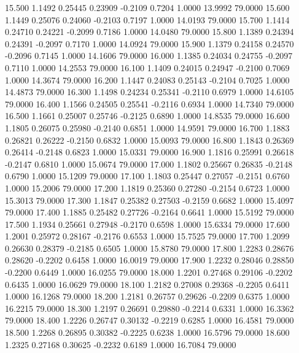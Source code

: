  15.500   1.1492   0.25445   0.23909  -0.2109   0.7204   1.0000  13.9992  79.0000
  15.600   1.1449   0.25076   0.24060  -0.2103   0.7197   1.0000  14.0193  79.0000
  15.700   1.1414   0.24710   0.24221  -0.2099   0.7186   1.0000  14.0480  79.0000
  15.800   1.1389   0.24394   0.24391  -0.2097   0.7170   1.0000  14.0924  79.0000
  15.900   1.1379   0.24158   0.24570  -0.2096   0.7145   1.0000  14.1606  79.0000
  16.000   1.1385   0.24034   0.24755  -0.2097   0.7110   1.0000  14.2553  79.0000
  16.100   1.1409   0.24015   0.24947  -0.2100   0.7069   1.0000  14.3674  79.0000
  16.200   1.1447   0.24083   0.25143  -0.2104   0.7025   1.0000  14.4873  79.0000
  16.300   1.1498   0.24234   0.25341  -0.2110   0.6979   1.0000  14.6105  79.0000
  16.400   1.1566   0.24505   0.25541  -0.2116   0.6934   1.0000  14.7340  79.0000
  16.500   1.1661   0.25007   0.25746  -0.2125   0.6890   1.0000  14.8535  79.0000
  16.600   1.1805   0.26075   0.25980  -0.2140   0.6851   1.0000  14.9591  79.0000
  16.700   1.1883   0.26821   0.26222  -0.2150   0.6832   1.0000  15.0093  79.0000
  16.800   1.1843   0.26369   0.26414  -0.2148   0.6823   1.0000  15.0331  79.0000
  16.900   1.1816   0.25991   0.26618  -0.2147   0.6810   1.0000  15.0674  79.0000
  17.000   1.1802   0.25667   0.26835  -0.2148   0.6790   1.0000  15.1209  79.0000
  17.100   1.1803   0.25447   0.27057  -0.2151   0.6760   1.0000  15.2006  79.0000
  17.200   1.1819   0.25360   0.27280  -0.2154   0.6723   1.0000  15.3013  79.0000
  17.300   1.1847   0.25382   0.27503  -0.2159   0.6682   1.0000  15.4097  79.0000
  17.400   1.1885   0.25482   0.27726  -0.2164   0.6641   1.0000  15.5192  79.0000
  17.500   1.1934   0.25661   0.27948  -0.2170   0.6598   1.0000  15.6334  79.0000
  17.600   1.2001   0.25972   0.28167  -0.2176   0.6553   1.0000  15.7525  79.0000
  17.700   1.2099   0.26630   0.28379  -0.2185   0.6505   1.0000  15.8780  79.0000
  17.800   1.2283   0.28676   0.28620  -0.2202   0.6458   1.0000  16.0019  79.0000
  17.900   1.2232   0.28046   0.28850  -0.2200   0.6449   1.0000  16.0255  79.0000
  18.000   1.2201   0.27468   0.29106  -0.2202   0.6435   1.0000  16.0629  79.0000
  18.100   1.2182   0.27008   0.29368  -0.2205   0.6411   1.0000  16.1268  79.0000
  18.200   1.2181   0.26757   0.29626  -0.2209   0.6375   1.0000  16.2215  79.0000
  18.300   1.2197   0.26691   0.29880  -0.2214   0.6331   1.0000  16.3362  79.0000
  18.400   1.2226   0.26747   0.30132  -0.2219   0.6285   1.0000  16.4581  79.0000
  18.500   1.2268   0.26895   0.30382  -0.2225   0.6238   1.0000  16.5796  79.0000
  18.600   1.2325   0.27168   0.30625  -0.2232   0.6189   1.0000  16.7084  79.0000
